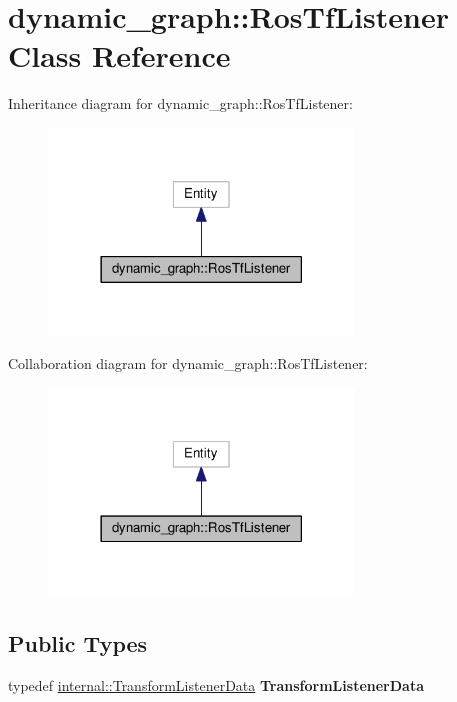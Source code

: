 \hypertarget{classdynamic__graph_1_1RosTfListener}{}\section{dynamic\+\_\+graph\+:\+:Ros\+Tf\+Listener Class Reference}
\label{classdynamic__graph_1_1RosTfListener}


Inheritance diagram for dynamic\+\_\+graph\+:\+:Ros\+Tf\+Listener\+:\nopagebreak
\begin{figure}[H]
\begin{center}
\leavevmode
\includegraphics[width=230pt]{classdynamic__graph_1_1RosTfListener__inherit__graph}
\end{center}
\end{figure}


Collaboration diagram for dynamic\+\_\+graph\+:\+:Ros\+Tf\+Listener\+:\nopagebreak
\begin{figure}[H]
\begin{center}
\leavevmode
\includegraphics[width=230pt]{classdynamic__graph_1_1RosTfListener__coll__graph}
\end{center}
\end{figure}
\subsection*{Public Types}
\begin{DoxyCompactItemize}
\item 
typedef \hyperlink{structdynamic__graph_1_1internal_1_1TransformListenerData}{internal\+::\+Transform\+Listener\+Data} {\bfseries Transform\+Listener\+Data}\hypertarget{classdynamic__graph_1_1RosTfListener_acdd29e75471c27a6c4d412781254352f}{}\label{classdynamic__graph_1_1RosTfListener_acdd29e75471c27a6c4d412781254352f}

\end{DoxyCompactItemize}

